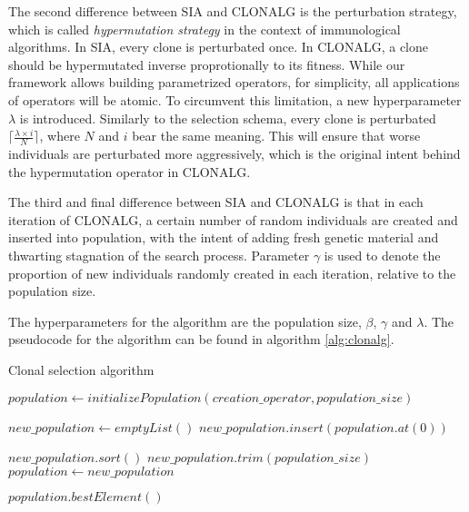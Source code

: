 The second difference between SIA and CLONALG is the perturbation strategy, which is called \textit{hypermutation strategy} in the context of immunological algorithms. In SIA, every clone is perturbated once. In CLONALG, a clone should be hypermutated inverse proprotionally to its fitness. While our framework allows building parametrized operators, for simplicity, all applications of operators will be atomic. To circumvent this limitation, a new hyperparameter $\lambda$ is introduced. Similarly to the selection schema, every clone is perturbated $\lceil \frac{\lambda \times i}{N} \rceil$, where $N$ and $i$ bear the same meaning. This will ensure that worse individuals are perturbated more aggressively, which is the original intent behind the hypermutation operator in CLONALG.

The third and final difference between SIA and CLONALG is that in each iteration of CLONALG, a certain number of random individuals are created and inserted into population, with the intent of adding fresh genetic material and thwarting stagnation of the search process. Parameter $\gamma$ is used to denote the proportion of new individuals randomly created in each iteration, relative to the population size.

The hyperparameters for the algorithm are the population size, $\beta$, $\gamma$ and $\lambda$. The pseudocode for the algorithm can be found in algorithm \ref{alg:clonalg}.

\begin{algorithm}[!htbp]
    \caption{Clonal selection algorithm}
    \label{alg:clonalg}

    $population \gets initializePopulation(creation\_operator, population\_size)$\;

     {

        $new\_population \gets emptyList()$\;
        $new\_population.insert(population.at(0))$\;



        $new\_population.sort()$\;
        $new\_population.trim(population\_size)$\;
        $population \gets new\_population$\;
    }

    \Return $population.bestElement()$\;
    \end{algorithm}